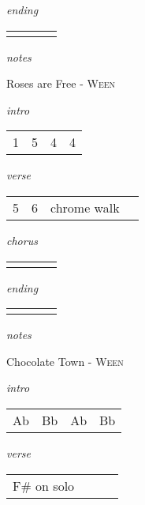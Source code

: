 \documentclass[12pt]{article}
\begin{document}
\textit{ending}

\begin{tabular}{|P{1.25in}|P{1.25in}|P{1.25in}|P{1.25in}|}
    &   &   &   \\
\end{tabular}

\textit{notes}

\newpage

{\Huge Roses are Free} {\huge - \textsc{Ween}}

\huge
\textit{intro}

\begin{tabular}{|P{1.25in}|P{1.25in}|P{1.25in}|P{1.25in}|}
   1 &  5 &  4 &  4 \\
\end{tabular}

\textit{verse}

\begin{tabular}{|P{1.25in}|P{1.25in}|P{1.25in}|P{1.25in}|}
   5 &  6 & chrome walk &   \\
\end{tabular}

\textit{chorus}

\begin{tabular}{|P{1.25in}|P{1.25in}|P{1.25in}|P{1.25in}|}
    &   &   &   \\
\end{tabular}

\textit{ending}

\begin{tabular}{|P{1.25in}|P{1.25in}|P{1.25in}|P{1.25in}|}
    &   &   &   \\
\end{tabular}

\textit{notes}

\newpage

{\Huge Chocolate Town} {\huge - \textsc{Ween}}

\huge
\textit{intro}

\begin{tabular}{|P{1.25in}|P{1.25in}|P{1.25in}|P{1.25in}|}
   Ab &  Bb &  Ab &  Bb \\
\end{tabular}

\textit{verse}

\begin{tabular}{|P{1.25in}|P{1.25in}|P{1.25in}|P{1.25in}|}
  F# on solo  &   &   &   \\
\end{tabular}
\end{document}
